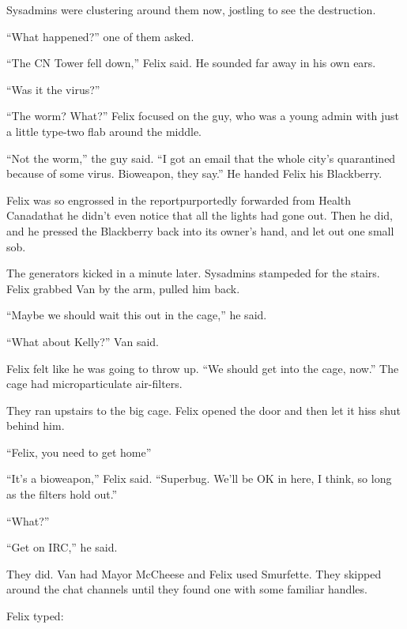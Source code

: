 Sysadmins were clustering around them now, jostling to see the
destruction.

“What happened?” one of them asked.

“The CN Tower fell down,” Felix said. He sounded far away in his
own ears.

“Was it the virus?”

“The worm? What?” Felix focused on the guy, who was a young admin
with just a little type-two flab around the middle.

“Not the worm,” the guy said. “I got an email that the whole city’s
quarantined because of some virus. Bioweapon, they say.” He handed
Felix his Blackberry.

Felix was so engrossed in the report\dash{}purportedly forwarded from
Health Canada\dash{}that he didn’t even notice that all the lights had
gone out. Then he did, and he pressed the Blackberry back into its
owner’s hand, and let out one small sob.

\tb

The generators kicked in a minute later. Sysadmins stampeded for
the stairs. Felix grabbed Van by the arm, pulled him back.

“Maybe we should wait this out in the cage,” he said.

“What about Kelly?” Van said.

Felix felt like he was going to throw up. “We should get into the
cage, now.” The cage had microparticulate air-filters.

They ran upstairs to the big cage. Felix opened the door and then
let it hiss shut behind him.

“Felix, you need to get home\dash{}”

“It’s a bioweapon,” Felix said. “Superbug. We’ll be OK in here, I
think, so long as the filters hold out.”

“What?”

“Get on IRC,” he said.

They did. Van had Mayor McCheese and Felix used Smurfette. They
skipped around the chat channels until they found one with some
familiar handles.


Felix typed: 

